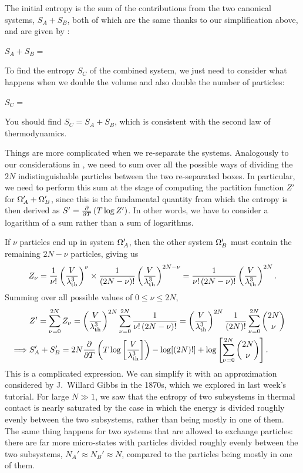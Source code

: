 \newpage %
The initial entropy is the sum of the contributions from the two canonical systems, $S_A + S_B$, both of which are the same thanks to our simplification above, and are given by :
\begin{mdframed}
  $\displaystyle S_A + S_B = $ \\[50 pt]
\end{mdframed}
To find the entropy $S_C$ of the combined system, we just need to consider what happens when we double the volume and also double the number of particles:
\begin{mdframed}
  $\displaystyle S_C = $ \\[50 pt]
\end{mdframed}
You should find $S_C = S_A + S_B$, which is consistent with the second law of thermodynamics.

Things are more complicated when we re-separate the systems.
Analogously to our considerations in , we need to sum over all the possible ways of dividing the $2N$ indistinguishable particles between the two re-separated boxes.
In particular, we need to perform this sum at the stage of computing the partition function $Z'$ for $\Omega_A' + \Omega_B'$, since this is the fundamental quantity from which the entropy is then derived as $S' = \frac{\partial }{\partial T}\left(T\log Z'\right)$. %
In other words, we have to consider a logarithm of a sum rather than a sum of logarithms.

If $\nu$ particles end up in system $\Omega_A'$, then the other system $\Omega_B'$ must contain the remaining $2N - \nu$ particles, giving us
\begin{equation*}
  Z_{\nu} = \frac{1}{\nu!} \left(\frac{V}{\lambda_{\mathrm{th}}^3}\right)^{\nu} \times \frac{1}{(2N - \nu)!} \left(\frac{V}{\lambda_{\mathrm{th}}^3}\right)^{2N - \nu} = \frac{1}{\nu! \, (2N - \nu)!} \left(\frac{V}{\lambda_{\mathrm{th}}^3}\right)^{2N}.
\end{equation*}
Summing over all possible values of $0 \leq \nu \leq 2N$,
\begin{align*}
  & Z' = \sum_{\nu = 0}^{2N} Z_{\nu} = \left(\frac{V}{\lambda_{\mathrm{th}}^3}\right)^{2N} \sum_{\nu = 0}^{2N} \frac{1}{\nu! \, (2N - \nu)!} = \left(\frac{V}{\lambda_{\mathrm{th}}^3}\right)^{2N} \frac{1}{(2N)!} \sum_{\nu = 0}^{2N} \binom{2N}{\nu} \cr
  \implies & S_A' + S_B' = 2N \frac{\partial }{\partial T}\left(T\log \left[\frac{V}{\lambda_{\mathrm{th}}^3}\right]\right) - \log[(2N)!] + \log\left[\sum_{\nu = 0}^{2N} \binom{2N}{\nu}\right].
\end{align*}
This is a complicated expression.
We can simplify it with an approximation considered by J.\ Willard Gibbs in the 1870s, which we explored in last week's tutorial. %
For large $N \gg 1$, we saw that the entropy of two subsystems in thermal contact is nearly saturated by the case in which the energy is divided roughly evenly between the two subsystems, rather than being mostly in one of them.
The same thing happens for two systems that are allowed to exchange particles: there are far more micro-states with particles divided roughly evenly between the two subsystems, $N_A' \approx N_B' \approx N$, compared to the particles being mostly in one of them.

